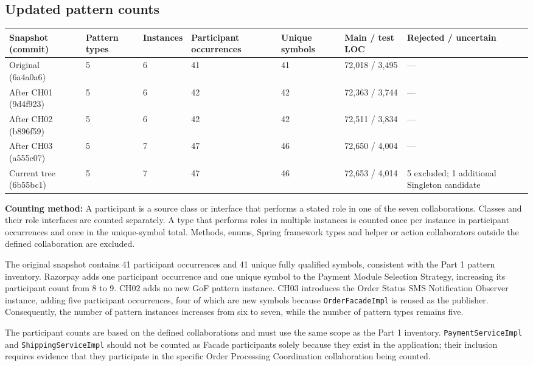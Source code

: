 \documentclass[11pt,a4paper]{article}
\newcommand{\tsmall}{\small\setlength{\tabcolsep}{3pt}}
\begin{document}
\subsection{Updated pattern counts}\label{sec:counts}

\begingroup\tsmall
\begin{longtable}{@{}P{3.0cm}P{1.2cm}P{1.5cm}P{1.8cm}P{1.8cm}P{2.6cm}P{3.0cm}@{}}
\toprule
\textbf{Snapshot (commit)} & \textbf{Pattern types} & \textbf{Instances} & \textbf{Participant occurrences} & \textbf{Unique symbols} & \textbf{Main / test LOC} & \textbf{Rejected / uncertain}\\
\midrule
\endhead
Original (6a4a0a6) & 5 & 6 & 41 & 41 & 72,018 / 3,495 & ---\\
After CH01 (9d4f923) & 5 & 6 & 42 & 42 & 72,363 / 3,744 & ---\\
After CH02 (b896f59) & 5 & 6 & 42 & 42 & 72,511 / 3,834 & ---\\
After CH03 (a555c07) & 5 & 7 & 47 & 46 & 72,650 / 4,004 & ---\\
Current tree (6b55bc1) & 5 & 7 & 47 & 46 & 72,653 / 4,014 & 5 excluded; 1 additional Singleton candidate\\
\bottomrule
\end{longtable}
\endgroup

\textbf{Counting method:} A participant is a source class or interface that performs a stated role in one of the seven collaborations. Classes and their role interfaces are counted separately. A type that performs roles in multiple instances is counted once per instance in participant occurrences and once in the unique-symbol total. Methods, enums, Spring framework types and helper or action collaborators outside the defined collaboration are excluded.

The original snapshot contains 41 participant occurrences and 41 unique fully qualified symbols, consistent with the Part 1 pattern inventory. Razorpay adds one participant occurrence and one unique symbol to the Payment Module Selection Strategy, increasing its participant count from 8 to 9. CH02 adds no new GoF pattern instance. CH03 introduces the Order Status SMS Notification Observer instance, adding five participant occurrences, four of which are new symbols because \texttt{Order\allowbreak{}Facade\allowbreak{}Impl} is reused as the publisher. Consequently, the number of pattern instances increases from six to seven, while the number of pattern types remains five.

The participant counts are based on the defined collaborations and must use the same scope as the Part 1 inventory. \texttt{Payment\allowbreak{}Service\allowbreak{}Impl} and \texttt{Shipping\allowbreak{}Service\allowbreak{}Impl} should not be counted as Facade participants solely because they exist in the application; their inclusion requires evidence that they participate in the specific Order Processing Coordination collaboration being counted.
\end{document}
